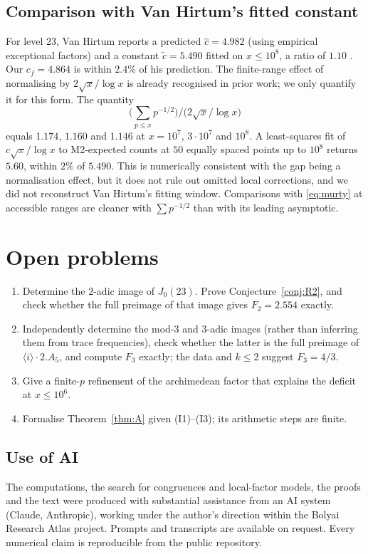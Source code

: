 \documentclass[11pt]{amsart}
\theoremstyle{definition}
\theoremstyle{remark}
\begin{document}
\subsection{Comparison with Van Hirtum's fitted constant}
For level $23$, Van Hirtum reports a predicted $\hat c=4.982$ (using empirical exceptional factors) and a constant $\tilde c=5.490$ fitted on $x\le10^8$, a ratio of $1.10$ \cite[Table~1]{VH}. Our $c_f=4.864$ is within $2.4\%$ of his prediction. The finite-range effect of normalising by $2\sqrt x/\log x$ is already recognised in prior work; we only quantify it for this form. The quantity
\[
\Big(\sum_{p\le x}p^{-1/2}\Big)\Big/\Big(2\sqrt x/\log x\Big)
\]
equals $1.174$, $1.160$ and $1.146$ at $x=10^7$, $3\cdot10^7$ and $10^8$. A least-squares fit of $c\sqrt x/\log x$ to M2-expected counts at $50$ equally spaced points up to $10^8$ returns $5.60$, within $2\%$ of $5.490$. This is numerically consistent with the gap being a normalisation effect, but it does not rule out omitted local corrections, and we did not reconstruct Van Hirtum's fitting window. Comparisons with \eqref{eq:murty} at accessible ranges are cleaner with $\sum p^{-1/2}$ than with its leading asymptotic.

\section{Open problems}
\begin{enumerate}
\item Determine the $2$-adic image of $J_0(23)$. Prove Conjecture~\ref{conj:R2}, and check whether the full preimage of that image gives $F_2=2.554$ exactly.
\item Independently determine the mod-$3$ and $3$-adic images (rather than inferring them from trace frequencies), check whether the latter is the full preimage of $\langle i\rangle\cdot2.A_5$, and compute $F_3$ exactly; the data and $k\le2$ suggest $F_3=4/3$.
\item Give a finite-$p$ refinement of the archimedean factor that explains the deficit at $x\le10^6$.
\item Formalise Theorem~\ref{thm:A} given (I1)--(I3); its arithmetic steps are finite.
\end{enumerate}

\subsection*{Use of AI}
The computations, the search for congruences and local-factor models, the proofs and the text were produced with substantial assistance from an AI system (Claude, Anthropic), working under the author's direction within the Bolyai Research Atlas project. Prompts and transcripts are available on request. Every numerical claim is reproducible from the public repository.
\end{document}
